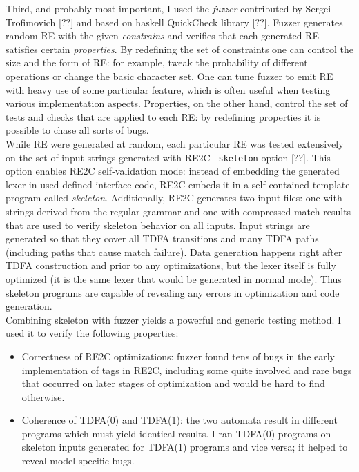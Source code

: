 \documentclass{article}
\theoremstyle{definition}
\begin{document}
\begin{multicols}{2}
Third, and probably most important, I used the \emph{fuzzer} contributed by Sergei Trofimovich [??] and based on haskell QuickCheck library [??].
Fuzzer generates random RE with the given \emph{constrains}
and verifies that each generated RE satisfies certain \emph{properties}.
By redefining the set of constraints one can control the size and the form of RE:
for example, tweak the probability of different operations or change the basic character set.
One can tune fuzzer to emit RE with heavy use of some particular feature,
which is often useful when testing various implementation aspects.
Properties, on the other hand, control the set of tests and checks that are applied to each RE:
by redefining properties it is possible to chase all sorts of bugs.
\\

While RE were generated at random, each particular RE was tested extensively
on the set of input strings generated with RE2C \texttt{--skeleton} option [??].
This option enables RE2C self-validation mode:
instead of embedding the generated lexer in used-defined interface code,
RE2C embeds it in a self-contained template program called \emph{skeleton}.
Additionally, RE2C generates two input files: one with strings derived from the regular grammar
and one with compressed match results that are used to verify skeleton behavior on all inputs.
Input strings are generated so that they cover all TDFA transitions and many TDFA paths
(including paths that cause match failure).
Data generation happens right after TDFA construction and prior to any optimizations,
but the lexer itself is fully optimized (it is the same lexer that would be generated in normal mode).
Thus skeleton programs are capable of revealing any errors in optimization and code generation.
\\

Combining skeleton with fuzzer yields a powerful and generic testing method.
I used it to verify the following properties:

\begin{itemize}
    \setlength{\parskip}{0.5em}

    \item Correctness of RE2C optimizations:
        fuzzer found tens of bugs in the early implementation of tags in RE2C,
        including some quite involved and rare bugs that occurred on later stages of optimization
        and would be hard to find otherwise.

    \item Coherence of TDFA(0) and TDFA(1):
        the two automata result in different programs which must yield identical results.
        I ran TDFA(0) programs on skeleton inputs generated for TDFA(1) programs and vice versa;
        it helped to reveal model-specific bugs.


\end{itemize}
\end{multicols}
\end{document}

